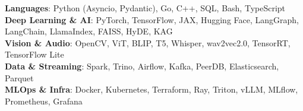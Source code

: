 \begin{itemize}[leftmargin=0.15in, label={}]
  \small{\item{
    \textbf{Languages}{: Python (Asyncio, Pydantic), Go, C++, SQL, Bash, TypeScript} \\
    \textbf{Deep Learning \& AI}{: PyTorch, TensorFlow, JAX, Hugging Face, LangGraph, LangChain, LlamaIndex, FAISS, HyDE, KAG} \\
    \textbf{Vision \& Audio}{: OpenCV, ViT, BLIP, T5, Whisper, wav2vec2.0, TensorRT, TensorFlow Lite} \\
    \textbf{Data \& Streaming}{: Spark, Trino, Airflow, Kafka, PeerDB, Elasticsearch, Parquet} \\
    \textbf{MLOps \& Infra}{: Docker, Kubernetes, Terraform, Ray, Triton, vLLM, MLflow, Prometheus, Grafana}
  }}
\end{itemize}

